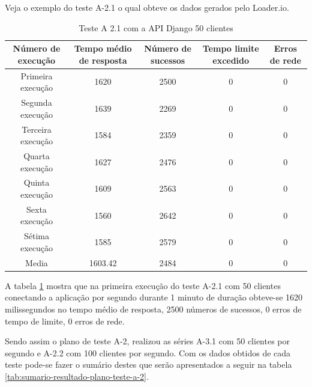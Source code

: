  Veja o exemplo do teste A-2.1 o qual obteve os dados gerados pelo Loader.io.
  
  \begin{table}[H]
    \centering
    \footnotesize
    \setlength{\abovecaptionskip}{0pt}
    \setlength{\belowcaptionskip}{0pt}
    \caption[Teste A-2.1 com a API Django 50 clientes]{Teste A 2.1 com a API Django 50 clientes}
    \label{tab:teste-a-2-1}
    \begin{tabular}{c|c|c|c|c}
      \hline \hline
      Número de execução &	Tempo médio de resposta &	Número de sucessos &	Tempo limite excedido &	 Erros de rede \\
      \hline \hline
      Primeira execução &	1620 &				2500 &			0 &				0 \\
      Segunda execução &	1639 &				2269 &			0 &				0 \\
      Terceira execução &	1584 &				2359 &			0 &				0 \\
      Quarta execução  &	1627 &				2476 &			0 &				0 \\
      Quinta execução  &	1609 &				2563 &			0 &				0 \\
      Sexta execução   &	1560 &				2642 &			0 &				0 \\
      Sétima execução  &	1585 &				2579 &			0 &				0 \\
      Media & 			1603.42 &			2484 & 			0 &				0 \\
      \hline \hline
    \end{tabular}
  \end{table}
  
  A tabela \ref{tab:teste-a-2-1} mostra que na primeira execução do teste A-2.1 com 50 clientes conectando a aplicação por segundo
  durante 1 minuto de duração obteve-se 1620 milissegundos no tempo médio de resposta,
  2500 números de sucessos, 0 erros de tempo de limite, 0 erros de rede.
  
  Sendo assim o plano de teste A-2, realizou as séries A-3.1 com 50 clientes por segundo e A-2.2 com 100 clientes por segundo.
  Com os dados obtidos de cada teste pode-se fazer o sumário destes que serão apresentados 
  a seguir na tabela \ref{tab:sumario-resultado-plano-teste-a-2}.
  

